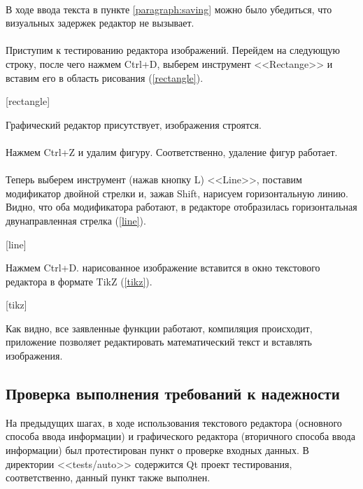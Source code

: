 \documentclass[testmethods]{espd}
\begin{document}
\paragraph{} %
В ходе ввода текста в пункте \ref{paragraph:saving} можно было убедиться, что визуальных задержек редактор не вызывает.

\paragraph{} %
Приступим к тестированию редактора изображений. Перейдем на следующую строку, после чего нажмем Ctrl+D, выберем инструмент <<Rectange>> и вставим его в область рисования (\ref{rectangle}).

[rectangle]

Графический редактор присутствует, изображения строятся.

\paragraph{} %
Нажмем Ctrl+Z и удалим фигуру. Соответственно, удаление фигур работает.

\paragraph{} %
Теперь выберем инструмент (нажав кнопку L) <<Line>>, поставим модификатор двойной стрелки и, зажав Shift, нарисуем горизонтальную линию. Видно, что оба модификатора работают, в редакторе отобразилась горизонтальная двунаправленная стрелка (\ref{line}).

[line]

Нажмем Ctrl+D. нарисованное изображение вставится в окно текстового редактора в формате TikZ (\ref{tikz}).

[tikz]

Как видно, все заявленные функции работают, компиляция происходит, приложение позволяет редактировать математический текст и вставлять изображения.


\subsection{Проверка выполнения требований к надежности}
На предыдущих шагах, в ходе использования текстового редактора (основного способа ввода информации) и графического редактора (вторичного способа ввода информации) был протестирован пункт о проверке входных данных. В директории <<tests/auto>> содержится Qt проект тестирования, соответственно, данный пункт также выполнен.


\end{document}
